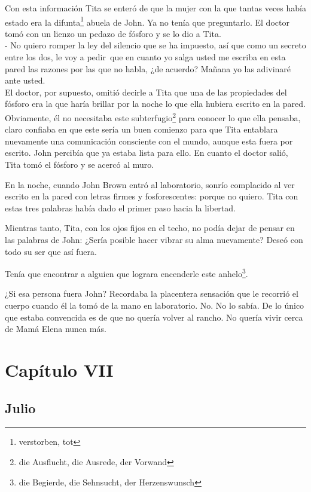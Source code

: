 Con esta información Tita se enteró de que la mujer con la que tantas
veces había estado era la difunta\footnote{verstorben, tot}
abuela de John. Ya no tenía que preguntarlo.
El doctor tomó con un lienzo un pedazo de fósforo y se lo dio a
Tita.
\\- No quiero romper la ley del silencio que se ha impuesto, así que como %
un secreto entre los dos, le voy a pedir~que en cuanto yo salga %
usted me escriba en esta pared las razones por las que no habla, ¿de %
acuerdo? Mañana yo las adivinaré ante usted.\\

El doctor, por supuesto, omitió decirle a Tita que una de las
propiedades del fósforo era la que haría brillar por la noche lo que
ella hubiera escrito en la pared. Obviamente, él no necesitaba este subterfugio\footnote{die Ausflucht, die Ausrede, der Vorwand}
para conocer lo que ella pensaba, claro confiaba en que este
sería un buen comienzo para que Tita entablara
nuevamente una comunicación consciente con el mundo, aunque esta fuera por escrito.
John percibía que ya estaba lista para ello. En cuanto el doctor salió,
Tita tomó el fósforo y se acercó al muro.

En la noche, cuando John Brown entró al laboratorio, sonrío complacido
al ver escrito en la pared con letras firmes y fosforescentes: \glqq{}porque
no quiero\grqq{}. Tita con estas tres palabras había dado el primer
paso hacia la libertad.

Mientras tanto, Tita, con los ojos fijos en el techo, no podía dejar
de pensar en las palabras de John: ¿Sería posible hacer vibrar su alma
nuevamente? Deseó con todo su ser que así fuera.

Tenía que encontrar a alguien que lograra encenderle este anhelo\footnote{die Begierde, die Sehnsucht, der Herzenswunsch}.

¿Si esa persona fuera John? Recordaba la placentera sensación que le
recorrió el cuerpo cuando él la tomó de la mano en laboratorio. No. No
lo sabía. De lo único que estaba convencida es de que no quería volver
al rancho. No quería vivir cerca de Mamá Elena nunca más.

\clearpage

\section*{ Capítulo VII }
\subsection*{ Julio }
